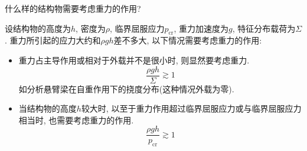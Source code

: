 \begin{problem}[20]
什么样的结构物需要考虑重力的作用?
\end{problem}
\begin{solution}
设结构物的高度为$h$, 密度为$\rho$, 临界屈服应力$p_\mathrm{cr}$, 重力加速度为$g$, 特征分布载荷为$\Sigma$. 重力所引起的应力大约和$\rho g h$差不多大, 以下情况需要考虑重力的作用:
\begin{itemize}
\item 重力占主导作用或相对于外载并不是很小时, 则显然要考虑重力.
\[
\frac{\rho g h}{\Sigma}\gtrsim 1
\]
如分析悬臂梁在自重作用下的挠度分布(这种情况外载为零).
\item 当结构物的高度$h$较大时, 以至于重力作用超过临界屈服应力或与临界屈服应力相当时, 也需要考虑重力的作用.
\[
\frac{\rho g h}{p_\mathrm{cr}}\gtrsim 1
\]
\end{itemize}
\end{solution}
